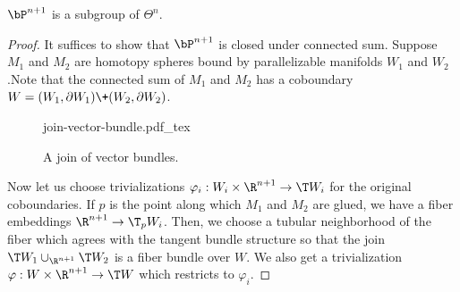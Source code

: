 \begin{proposition}
	$\bP^{n+1}$ is a subgroup of $\Theta^n$.
\end{proposition}
\begin{proof}
	It suffices to show that $\bP^{n+1}$ is closed under connected sum. Suppose $M_1$ and $M_2$ are homotopy spheres bound by parallelizable manifolds $W_1$ and $W_2$.Note that the connected sum of $M_1$ and $M_2$ has a coboundary $W=(W_1,\partial W_1)\+(W_2,\partial W_2)$.

	\begin{figure}[ht]
		\centering
		{join-vector-bundle.pdf_tex}
		\caption{A join of vector bundles.}
	\end{figure}
	
	Now let us choose trivializations $\varphi_i : W_i\times \R^{n+1} \to \T W_i$ for the original coboundaries. If $p$ is the point along which $M_1$ and $M_2$ are glued, we have a fiber embeddings $\R^{n+1}\to \T_p W_i$. Then, we choose a tubular neighborhood of the fiber which agrees with the tangent bundle structure so that the join $\T W_1\cup_{\R^{n+1}}\T W_2$ is a fiber bundle over $W$. We also get a trivialization $\varphi : W\times \R^{n+1} \to \T W$ which restricts to $\varphi_i$.
\end{proof}
